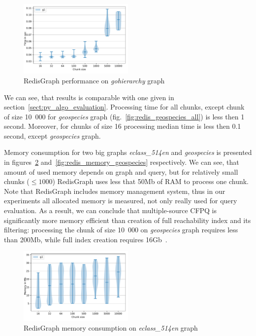 \begin{figure}[h]
\centering
\includegraphics[width=0.5\textwidth]{data/raw_redis/gohierarchy.pdf}
\caption{RedisGraph performance on \textit{gohierarchy} graph}
\label{fig:redis_gohierarchy_all}
\end{figure}

We can see, that results is comparable with one given in section~\ref{sect:py_algo_evaluation}. 
Processing time for all chunks, except chunk of size 10~000 for \textit{geospecies} graph (fig.~\ref{fig:redis_geospecies_all}) is less then 1 second.
Moreover, for chunks of size 16 processing median time is less then 0.1 second, except \textit{geospecies} graph.

Memory consumption for two big graphs \textit{eclass\_514en} and \textit{geospecies} is presented in figures~\ref{fig:redis_memory_eclass} and~\ref{fig:redis_memory_geospecies} respectively.
We can see, that amount of used memory depends on graph and query, but for relatively small chunks ($\leq 1000$) RedisGraph uses less that 50Mb of RAM to process one chunk.
Note that RedisGraph includes memory management system, thus in our experiments all allocated memory is measured, not only really used for query evaluation.
As a result, we can conclude that multiple-source CFPQ is significantly more memory efficient than creation of full reachability index and its filtering: processing the chunk of size 10~000 on \textit{geospecies} graph requires less than 200Mb, while full index creation requires 16Gb~\cite{10.1145/3398682.3399163}.  

\begin{figure}[h]
\centering
\includegraphics[width=0.5\textwidth]{data/raw_memory/eclass_514en.pdf}
\caption{RedisGraph memory consumption on \textit{eclass\_514en} graph}
\label{fig:redis_memory_eclass}
\end{figure}


